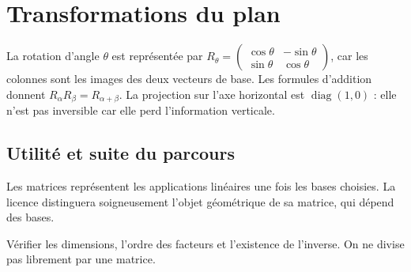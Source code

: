 \documentclass[../cours_tle.tex]{subfiles}
\begin{document}
\section{Transformations du plan}
La rotation d'angle $\theta$ est représentée par
$R_\theta=\begin{pmatrix}\cos\theta&-\sin\theta\\\sin\theta&\cos\theta\end{pmatrix}$,
car les colonnes sont les images des deux vecteurs de base. Les formules d'addition donnent $R_\alpha R_\beta=R_{\alpha+\beta}$.
La projection sur l'axe horizontal est $\operatorname{diag}(1,0)$ : elle n'est pas inversible car elle perd l'information verticale.
\begin{finchapitre}
\section{Utilité et suite du parcours}
Les matrices représentent les applications linéaires une fois les bases choisies. La licence distinguera soigneusement l'objet géométrique de sa matrice, qui dépend des bases.
\begin{retenir}
Vérifier les dimensions, l'ordre des facteurs et l'existence de l'inverse. On ne divise pas librement par une matrice.
\end{retenir}
\end{finchapitre}
\end{document}
